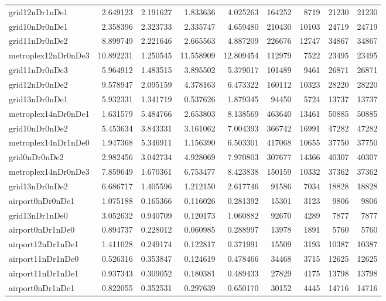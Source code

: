 \begin{longtable}{|l|r|r|r|r|r|r|r|r|}
grid12nDr1nDe1 & 2.649123 & 2.191627 & 1.833636 & 4.025263 & 164252 & 8719 & 21230 & 21230 \\
grid10nDr0nDe1 & 2.358396 & 2.323733 & 2.335747 & 4.659480 & 210430 & 10103 & 24719 & 24719 \\
grid11nDr0nDe2 & 8.899749 & 2.221646 & 2.665563 & 4.887209 & 226676 & 12747 & 34867 & 34867 \\
metroplex12nDr0nDe3 & 10.892231 & 1.250545 & 11.558909 & 12.809454 & 112979 & 7522 & 23495 & 23495 \\
grid11nDr0nDe3 & 5.964912 & 1.483515 & 3.895502 & 5.379017 & 101489 & 9461 & 26871 & 26871 \\
grid12nDr0nDe2 & 9.578947 & 2.095159 & 4.378163 & 6.473322 & 160112 & 10323 & 28220 & 28220 \\
grid13nDr0nDe1 & 5.932331 & 1.341719 & 0.537626 & 1.879345 & 94450 & 5724 & 13737 & 13737 \\
metroplex14nDr0nDe1 & 1.631579 & 5.484766 & 2.653803 & 8.138569 & 463640 & 13461 & 50885 & 50885 \\
grid10nDr0nDe2 & 5.453634 & 3.843331 & 3.161062 & 7.004393 & 366742 & 16991 & 47282 & 47282 \\
metroplex14nDr1nDe0 & 1.947368 & 5.346911 & 1.156390 & 6.503301 & 417068 & 10655 & 37750 & 37750 \\
grid0nDr0nDe2 & 2.982456 & 3.042734 & 4.928069 & 7.970803 & 307677 & 14366 & 40307 & 40307 \\
metroplex14nDr0nDe3 & 7.859649 & 1.670361 & 6.753477 & 8.423838 & 150159 & 10332 & 37362 & 37362 \\
grid13nDr0nDe2 & 6.686717 & 1.405596 & 1.212150 & 2.617746 & 91586 & 7034 & 18828 & 18828 \\
airport0nDr0nDe1 & 1.075188 & 0.165366 & 0.116026 & 0.281392 & 15301 & 3123 & 9806 & 9806 \\
grid13nDr1nDe0 & 3.052632 & 0.940709 & 0.120173 & 1.060882 & 92670 & 4289 & 7877 & 7877 \\
airport0nDr1nDe0 & 0.894737 & 0.228012 & 0.060985 & 0.288997 & 13978 & 1891 & 5760 & 5760 \\
airport12nDr1nDe1 & 1.411028 & 0.249174 & 0.122817 & 0.371991 & 15509 & 3193 & 10387 & 10387 \\
airport11nDr1nDe0 & 0.526316 & 0.353847 & 0.124619 & 0.478466 & 34468 & 3715 & 12625 & 12625 \\
airport11nDr1nDe1 & 0.937343 & 0.309052 & 0.180381 & 0.489433 & 27829 & 4175 & 13798 & 13798 \\
airport0nDr1nDe1 & 0.822055 & 0.352531 & 0.297639 & 0.650170 & 30152 & 4445 & 14716 & 14716 \\

\end{longtable}
